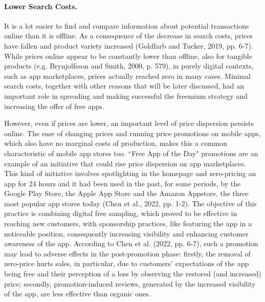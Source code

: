 \paragraph{Lower Search Costs.} 
It is a lot easier to find and compare information about potential transactions online than it is offline. As a consequence of the decrease in search costs, prices have fallen and product variety increased (Goldfarb and Tucker, 2019, pp. 6-7). While prices online appear to be constantly lower than offline, also for tangible products (e.g. Brynjolfsson and Smith, 2000, p. 579), in purely digital contexts, such as app marketplaces, prices actually reached zero in many cases. Minimal search costs, together with other reasons that will be later discussed, had an important role in spreading and making successful the freemium strategy and increasing the offer of free apps.

However, even if prices are lower, an important level of price dispersion persists online. The ease of changing prices and running price promotions on mobile apps, which also have no marginal costs of production, makes this a common characteristic of mobile app stores too. ``Free App of the Day" promotions are an example of an initiative that could rise price dispersion on app marketplaces. This kind of initiative involves spotlighting in the homepage and zero-pricing an app for 24 hours and it had been used in the past, for some periods, by the Google Play Store, the Apple App Store and the Amazon Appstore, the three most popular app stores today (Chen et al., 2022, pp. 1-2). The objective of this practice is combining digital free sampling, which proved to be effective in reaching new customers, with sponsorship practices, like featuring the app in a noticeable position, consequently increasing visibility and enhancing customer awareness of the app. According to Chen et al. (2022, pp. 6-7), such a promotion may lead to adverse effects in the post-promotion phase: firstly, the removal of zero-price hurts sales, in particular, due to customers' expectations of the app being free and their perception of a loss by observing the restored (and increased) price; secondly, promotion-induced reviews, generated by the increased visibility of the app, are less effective than organic ones.

